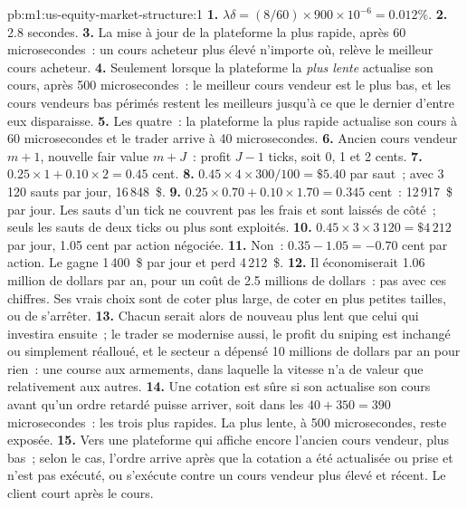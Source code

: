 \begin{solution}{pb:m1:us-equity-market-structure:1}
\textbf{1.} $\lambda\delta = (8/60) \times 900\times10^{-6} = 0.012\%$.
\textbf{2.} 2.8 secondes.
\textbf{3.} La mise à jour de la plateforme la plus rapide, après 60 microsecondes~: un cours acheteur plus élevé
n'importe où, relève le meilleur cours acheteur.
\textbf{4.} Seulement lorsque la plateforme la \emph{plus lente} actualise son cours, après 500
microsecondes~: le meilleur cours vendeur est le plus bas, et les cours vendeurs bas périmés restent
les meilleurs jusqu'à ce que le dernier d'entre eux disparaisse.
\textbf{5.} Les quatre~: la plateforme la plus rapide actualise son cours à 60 microsecondes et le trader
arrive à 40 microsecondes.
\textbf{6.} Ancien cours vendeur $m+1$, nouvelle fair value $m+J$~: profit $J-1$ ticks, soit
0, 1 et 2 cents.
\textbf{7.} $0.25 \times 1 + 0.10 \times 2 = 0.45$ cent.
\textbf{8.} $0.45 \times 4 \times 300/100 = \$5.40$ par saut~; avec 3\,120
sauts par jour, 16\,848~\$.
\textbf{9.} $0.25\times0.70 + 0.10\times1.70 = 0.345$ cent~: 12\,917~\$ par jour.
Les sauts d'un tick ne couvrent pas les frais et sont laissés de côté~; seuls les sauts de deux ticks ou
plus sont exploités.
\textbf{10.} $0.45 \times 3 \times 3\,120 = \$4\,212$ par jour, 1.05 cent par
action négociée.
\textbf{11.} Non~: $0.35 - 1.05 = -0.70$ cent par action. Le  gagne 1\,400~\$ par jour
et perd 4\,212~\$.
\textbf{12.} Il économiserait 1.06 million de dollars par an, pour un coût de 2.5 millions de dollars~: pas
avec ces chiffres. Ses vrais choix sont de coter plus large, de coter en plus petites tailles, ou de
s'arrêter.
\textbf{13.} Chacun serait alors de nouveau plus lent que celui qui investira ensuite~; le
trader se modernise aussi, le profit du sniping est inchangé ou simplement réalloué,
et le secteur a dépensé 10 millions de dollars par an pour rien~: une course aux armements, dans
laquelle la vitesse n'a de valeur que relativement aux autres.
\textbf{14.} Une cotation est sûre si son  actualise son cours avant qu'un ordre retardé
puisse arriver, soit dans les $40 + 350 = 390$ microsecondes~: les trois
plus rapides. La plus lente, à 500 microsecondes, reste exposée.
\textbf{15.} Vers une plateforme qui affiche encore l'ancien cours vendeur, plus bas~; selon le cas,
l'ordre arrive après que la cotation a été actualisée ou prise et n'est pas exécuté, ou
s'exécute contre un cours vendeur plus élevé et récent. Le client court après le cours.

\end{solution}
